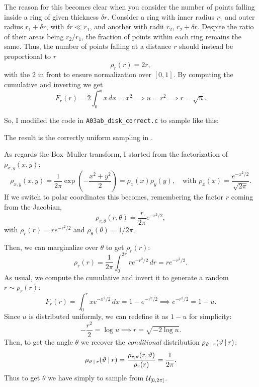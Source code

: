 The reason for this becomes clear when you consider the number of points falling
inside a ring of given thickness $\delta r$. Consider a ring with inner radius
$r_1$ and outer radius $r_1 + \delta r$, with $\delta r \ll r_1$, and another
with radii $r_2$, $r_2 + \delta r$.  Despite the ratio of their areas being $r_2
/ r_1$, the fraction of points within each ring remains the same. Thus, the
number of points falling at a distance $r$ should instead be proportional to $r$
\begin{equation}
    \rho_{r}(r) = 2r,
\end{equation}
with the $2$ in front to ensure normalization over $[0, 1]$. By computing the
cumulative and inverting we get 
\begin{equation}
    F_r(r) = 2 \int_{0}^{x} x \, dx = x^{2} \implies u = r^{2} \implies r =
    \sqrt{u}.
\end{equation}

So, I modified the code in \texttt{A03ab\_disk\_correct.c} to sample like this:

The result is the correctly uniform sampling in .

As regards the Box–Muller transform, I started from the factorization of
$\rho_{x, y}(x, y)$:
\begin{equation}
    \rho_{x, y}(x, y) = \frac{1}{2\pi} \exp\left(-\frac{x^{2} + y^{2}}{2}\right)
        = \rho_x(x) \rho_y(y), \quad \text{with }
        \rho_x(x) = \frac{e^{-x^{2}/2}}{\sqrt{2\pi}}.
\end{equation}
If we switch to polar coordinates this becomes, remembering the factor $r$
coming from the Jacobian,
\begin{equation}
    \rho_{r, \theta}(r, \theta) = \frac{r}{2\pi} e^{-r^{2}/2},
\end{equation}
with $\rho_r(r) = r e^{-r^{2}/2}$ and $\rho_\theta(\theta) = 1 / 2\pi$.

Then, we can marginalize over $\theta$ to get $\rho_r(r)$:
\begin{equation}
    \rho_r(r) = \frac{1}{2\pi} \int_{0}^{2\pi} r e^{-r^{2}/2} \, dr
        = r e^{-r^{2}/2}.
\end{equation}
As usual, we compute the cumulative and invert it to generate a random $r \sim
\rho_r(r)$:
\begin{equation}
    F_r(r) = \int_{0}^{r} x e^{-x^{2}/2} \, dx = 1 - e^{-r^{2}/2}
    \implies e^{-r^{2}/2} = 1 - u.
\end{equation}
Since $u$ is distributed uniformly, we can redefine it as $1 - u$ for
simplicity:
\begin{equation}
    -\frac{r^{2}}{2} = \log u \implies r = \sqrt{-2\log u}.
\end{equation}
Then, to get the angle $\theta$ we recover the \emph{conditional} distribution
$\rho_{\vartheta\:\vert\: r}(\vartheta \:\vert\: r)$:
\begin{equation}
    \rho_{\vartheta\:\vert\: r}(\vartheta\:\vert\: r)
        = \frac{\rho_{r, \vartheta}(r, \vartheta)}{\rho_{r}(r)} = \frac{1}{2\pi}.
\end{equation}
Thus to get $\theta$ we have simply to sample from $\mathcal{U}_{[0, 2\pi]}$.

